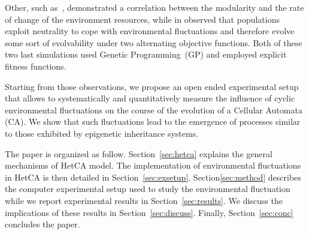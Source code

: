Other, such as~\cite{lipson2002origin}, demonstrated a correlation between the modularity and the rate of change of the environment resources, while in \cite{yu2007program} observed that populations exploit neutrality to cope with environmental fluctuations and therefore evolve some sort of evolvability under two alternating objective functions. Both of these two last simulations used Genetic Programming~(GP) and employed explicit fitness functions.

Starting from those observations, we propose an open ended experimental setup that allows to systematically and quantitatively measure the influence of cyclic environmental fluctuations on the course of the evolution of a Cellular Automata (CA). We show that such fluctuations lead to the emergence of processes similar to those exhibited by epigenetic inheritance systems. 

The paper is organized as follow. Section~\ref{sec:hetca} explains the general mechanisms of HetCA model. The implementation of environmental fluctuations in HetCA is then detailed in Section~\ref{sec:exsetup}. Section\ref{sec:method} describes the computer experimental setup used to study the environmental fluctuation while we report experimental results in Section~\ref{sec:results}. We discuss the implications of these results in Section~\ref{sec:discuss}. Finally, Section~\ref{sec:conc} concludes the paper.

